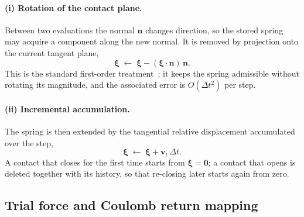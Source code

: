 \paragraph{(i) Rotation of the contact plane.}  Between two evaluations the
normal $\mathbf{n}$ changes direction, so the stored spring may acquire a
component along the new normal.  It is removed by projection onto the current
tangent plane,
\begin{equation}
  \boldsymbol{\xi} \;\leftarrow\;
  \boldsymbol{\xi} - (\boldsymbol{\xi}\cdot\mathbf{n})\,\mathbf{n} .
  \label{eq:xi-project}
\end{equation}
This is the standard first-order treatment~\cite{silbert2001}; it keeps the
spring admissible without rotating its magnitude, and the associated error is
$O(\Delta t^{2})$ per step.

\paragraph{(ii) Incremental accumulation.}  The spring is then extended by the
tangential relative displacement accumulated over the step,
\begin{equation}
  \boldsymbol{\xi} \;\leftarrow\;
  \boldsymbol{\xi} + \mathbf{v}_{t}\,\Delta t .
  \label{eq:xi-accumulate}
\end{equation}
A contact that closes for the first time starts from
$\boldsymbol{\xi}=\mathbf{0}$; a contact that opens is deleted together with its
history, so that re-closing later starts again from zero.

\subsection{Trial force and Coulomb return mapping}

